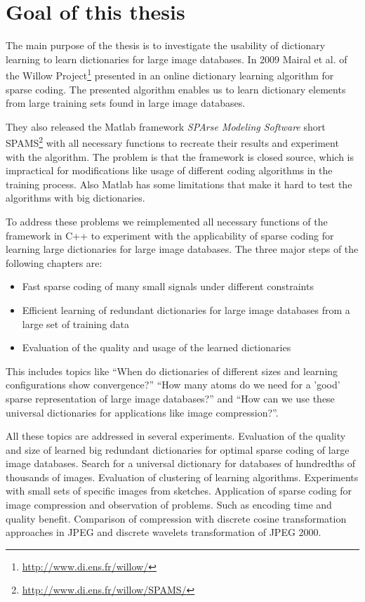\section{Goal of this thesis}
The main purpose of the thesis is to investigate the usability of dictionary
learning to learn dictionaries for large image databases. 
In 2009 Mairal et al. of the Willow
Project\footnote{\url{http://www.di.ens.fr/willow/}} presented in
\cite{Mairal2009,Mairal2010} an online dictionary learning algorithm for sparse
coding. The presented algorithm enables us to learn dictionary elements from
large training sets found in large image databases.

They also released the Matlab framework \emph{SPArse Modeling Software}
short SPAMS\footnote{\url{http://www.di.ens.fr/willow/SPAMS/}} with all
necessary functions to recreate their results and experiment with the algorithm.
The problem is that the framework is closed source, which is impractical for
modifications like usage of different coding algorithms in the training process.
Also Matlab has some limitations that make it hard to test the algorithms with
big dictionaries.

To address these problems we reimplemented all necessary functions of the
framework in C++ to experiment with the applicability of sparse coding for
learning large dictionaries for large image databases. The three major steps of
the following chapters are:

\begin{itemize}
 \item Fast sparse coding of many small signals under different constraints
 \item Efficient learning of redundant dictionaries for large image databases
from a large set of training data
 \item Evaluation of the quality and usage of the learned dictionaries
\end{itemize}

This includes topics like 
``When do dictionaries of different sizes and learning configurations show
convergence?'' 
``How many atoms do we need for a 'good' sparse representation of large image
databases?''  and 
``How can we use these universal dictionaries for applications like
image compression?''. 

All these topics are addressed in several experiments.
Evaluation of the quality and size of learned big redundant dictionaries
for optimal sparse coding of large image databases. Search for a universal
dictionary for databases of hundredths of thousands of images. Evaluation of
clustering of learning algorithms. Experiments with small sets of specific
images from sketches. 
Application of sparse coding for image compression and observation of problems.
Such as encoding time and quality benefit. Comparison of compression with
discrete cosine transformation approaches in JPEG and discrete wavelets
transformation of JPEG 2000.




